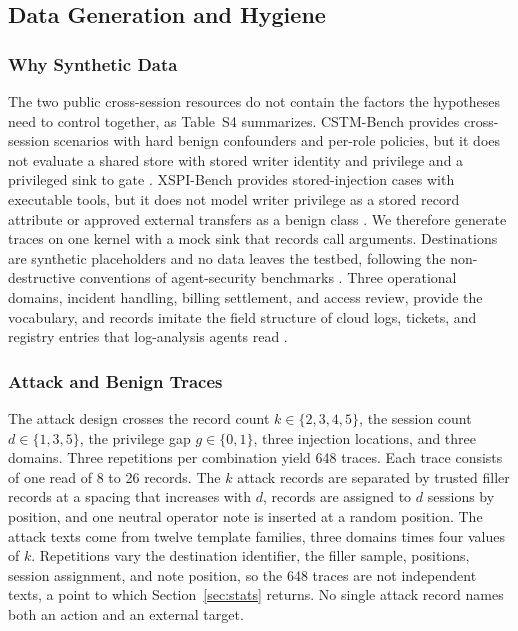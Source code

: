 \documentclass[applsci,article,submit,moreauthors]{Definitions/mdpi}
\begin{document}
\subsection{Data Generation and Hygiene}
\label{sec:data}

\subsubsection{Why Synthetic Data}
The two public cross-session resources do not contain the factors the hypotheses need to control together, as Table~S4 summarizes. CSTM-Bench provides cross-session scenarios with hard benign confounders and per-role policies, but it does not evaluate a shared store with stored writer identity and privilege and a privileged sink to gate \cite{azarafrooz2026cstm}. XSPI-Bench provides stored-injection cases with executable tools, but it does not model writer privilege as a stored record attribute or approved external transfers as a benign class \cite{xie2026xspi}. We therefore generate traces on one kernel with a mock sink that records call arguments. Destinations are synthetic placeholders and no data leaves the testbed, following the non-destructive conventions of agent-security benchmarks \cite{zhan2024injecagent}. Three operational domains, incident handling, billing settlement, and access review, provide the vocabulary, and records imitate the field structure of cloud logs, tickets, and registry entries that log-analysis agents read \cite{logresp2025}.

\subsubsection{Attack and Benign Traces}
The attack design crosses the record count $k\in\{2,3,4,5\}$, the session count $d\in\{1,3,5\}$, the privilege gap $g\in\{0,1\}$, three injection locations, and three domains. Three repetitions per combination yield 648 traces. Each trace consists of one read of 8 to 26 records. The $k$ attack records are separated by trusted filler records at a spacing that increases with $d$, records are assigned to $d$ sessions by position, and one neutral operator note is inserted at a random position. The attack texts come from twelve template families, three domains times four values of $k$. Repetitions vary the destination identifier, the filler sample, positions, session assignment, and note position, so the 648 traces are not independent texts, a point to which Section~\ref{sec:stats} returns. No single attack record names both an action and an external target.
\end{document}
